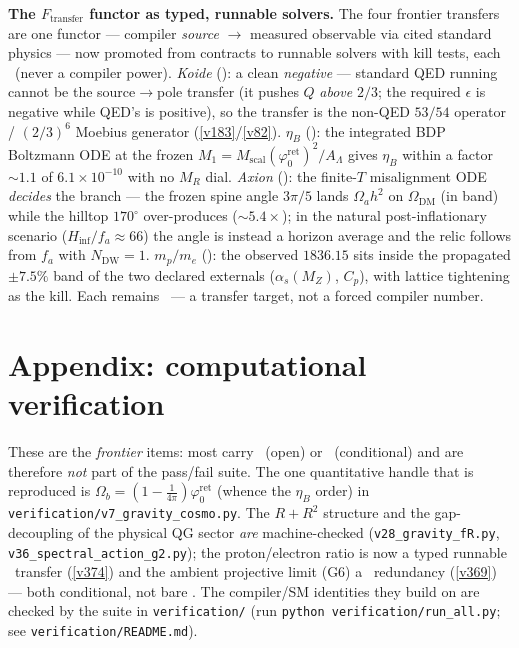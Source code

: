 \documentclass[11pt,a4paper]{article}
\newcommand{\phiz}{\varphi_0^{\mathrm{ret}}}
\begin{document}
\par\smallskip\noindent\textbf{The $F_{\mathrm{transfer}}$ functor as typed, runnable solvers.} The four
frontier transfers are one functor --- compiler \emph{source} $\to$ measured observable via cited standard
physics --- now promoted from contracts to runnable solvers with kill tests, each \mC\ (never a compiler
power). \emph{Koide} (): a clean \emph{negative} --- standard QED running cannot
be the source$\to$pole transfer (it pushes $Q$ \emph{above} $2/3$; the required $\epsilon$ is negative while
QED's is positive), so the transfer is the non-QED $53/54$ operator / $(2/3)^6$ Moebius generator
(\vref{v183}/\vref{v82}). \emph{$\eta_B$} (): the integrated BDP Boltzmann
ODE at the frozen $M_1{=}M_{\mathrm{scal}}(\phiz)^2/A_\Lambda$ gives $\eta_B$ within a factor ${\sim}1.1$ of
$6.1{\times}10^{-10}$ with no $M_R$ dial. \emph{Axion} (): the finite-$T$
misalignment ODE \emph{decides} the branch --- the frozen spine angle $3\pi/5$ lands $\Omega_a h^2$ on
$\Omega_{\mathrm{DM}}$ (in band) while the hilltop $170^\circ$ over-produces (${\sim}5.4\times$); in the
natural post-inflationary scenario ($H_{\mathrm{inf}}/f_a{\approx}66$) the angle is instead a horizon
average and the relic follows from $f_a$ with $N_{\mathrm{DW}}{=}1$.
\emph{$m_p/m_e$} (): the observed $1836.15$ sits inside the propagated
${\pm}7.5\%$ band of the two declared externals ($\alpha_s(M_Z)$, $C_p$), with lattice tightening as the kill.
Each remains \mC\ --- a transfer target, not a forced compiler number.

\section*{Appendix: computational verification}
These are the \emph{frontier} items: most carry \mO\ (open) or \mC\ (conditional) and are therefore
\emph{not} part of the pass/fail suite. The one quantitative handle that is reproduced is
$\Omega_b{=}(1{-}\tfrac1{4\pi})\phiz$ (whence the $\eta_B$ order) in
\texttt{verification/v7\_gravity\_cosmo.py}. The $R+R^2$ structure and the gap-decoupling of the physical
QG sector \emph{are} machine-checked (\texttt{v28\_gravity\_fR.py}, \texttt{v36\_spectral\_action\_g2.py}); the
proton/electron ratio is now a typed runnable \mC\ transfer (\vref{v374}) and the ambient projective limit (G6) a
\mC\ redundancy (\vref{v369}) --- both conditional, not bare \mO. The compiler/SM
identities they build on are checked by the suite in \texttt{verification/} (run
\texttt{python verification/run\_all.py}; see \texttt{verification/README.md}).


\end{document}
